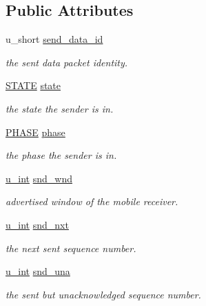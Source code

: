 \subsection*{\-Public \-Attributes}
\begin{DoxyCompactItemize}
\item 
u\-\_\-short \hyperlink{structserverState_a0d366ea25cf9e9c2adb3dea2ff2b8a6c}{send\-\_\-data\-\_\-id}
\begin{DoxyCompactList}\small\item\em the sent data packet identity. \end{DoxyCompactList}\item 
\hyperlink{split__tcp__gateway_8cpp_a275a67132f10277ada3a0ee3d616b647}{\-S\-T\-A\-T\-E} \hyperlink{structserverState_afe5c7957656e822dbffe80ca3da17f42}{state}
\begin{DoxyCompactList}\small\item\em the state the sender is in. \end{DoxyCompactList}\item 
\hyperlink{split__tcp__gateway_8cpp_ae279bfacbd0dac7aedff2c9121036de9}{\-P\-H\-A\-S\-E} \hyperlink{structserverState_ad2d20da3d49d1d327e5b96a3b4933645}{phase}
\begin{DoxyCompactList}\small\item\em the phase the sender is in. \end{DoxyCompactList}\item 
\hyperlink{split__tcp__gateway_8h_ac319c165d52643e43249fe003e18bdf3}{u\-\_\-int} \hyperlink{structserverState_a26d3e92a264e66f0309028bc1b4a0fdf}{snd\-\_\-wnd}
\begin{DoxyCompactList}\small\item\em advertised window of the mobile receiver. \end{DoxyCompactList}\item 
\hyperlink{split__tcp__gateway_8h_ac319c165d52643e43249fe003e18bdf3}{u\-\_\-int} \hyperlink{structserverState_ac22718f65dc3faefe5f0f14a34225890}{snd\-\_\-nxt}
\begin{DoxyCompactList}\small\item\em the next sent sequence number. \end{DoxyCompactList}\item 
\hyperlink{split__tcp__gateway_8h_ac319c165d52643e43249fe003e18bdf3}{u\-\_\-int} \hyperlink{structserverState_a8ffed075ab5c35026735e9b84ec52a9f}{snd\-\_\-una}
\begin{DoxyCompactList}\small\item\em the sent but unacknowledged sequence number. \end{DoxyCompactList}\item 

\end{DoxyCompactItemize}
